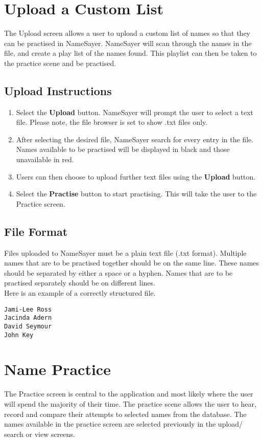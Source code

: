 \documentclass{article}
\begin{document}
\section{Upload a Custom List}
The Upload screen allows a user to upload a custom list of names so that they
can be practised in NameSayer.  NameSayer will scan through the names in the
file, and create a play list of the names found. This playlist can then be taken
to the practice scene and be practised.

\subsection{Upload Instructions}

\begin{enumerate}
	\item Select the \textbf{Upload} button. NameSayer will prompt the user to
	select a text file. Please note, the file browser is set to show .txt files
	only.

	\item After selecting the desired file, NameSayer search for every entry in
	the file. Names available to be practised will be displayed in black and
	those unavailable in red.

	\item Users can then choose to upload further text files using the
	\textbf{Upload} button.

	\item Select the \textbf{Practise} button to start practising. This will
	take the user to the Practice screen.

\end{enumerate}

\subsection{File Format}
Files uploaded to NameSayer must be a plain text file (.txt format).  Multiple
names that are to be practised together should be on the  same line. These names
should be separated by either a space or a hyphen. Names that are to be
practised separately should be on different lines. \\

Here is an example of a correctly structured file.
\begin{verbatim}
Jami-Lee Ross
Jacinda Adern
David Seymour
John Key
\end{verbatim}

\section{Name Practice}
The Practice screen is central to the application and most likely where the user
will spend the majority of their time. The practice scene allows the user to
hear, record and compare their attempts to selected names from the database. The
names available  in the practice screen are selected previously in the upload/
search or view screens.
\end{document}
